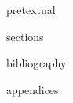 \documentclass[11pt]{report}
\begin{document}
{pretextual}

{sections}

{bibliography}

\clearpage

{appendices}
\end{document}
